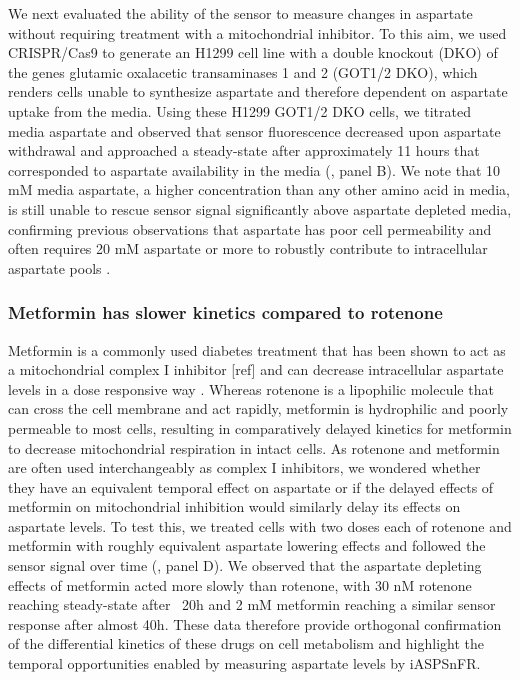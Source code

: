 \documentclass[9pt,lineno]{elife}
\begin{document}
We next evaluated the ability of the sensor to measure changes in aspartate without requiring treatment with a mitochondrial inhibitor.
To this aim, we used CRISPR/Cas9 to generate an H1299 cell line with a double knockout (DKO) of the genes glutamic oxalacetic transaminases 1 and 2 (GOT1/2 DKO), which renders cells unable to synthesize aspartate and therefore dependent on aspartate uptake from the media.
Using these H1299 GOT1/2 DKO cells, we titrated media aspartate and observed that sensor fluorescence decreased upon aspartate withdrawal and approached a steady-state after approximately 11 hours that corresponded to aspartate availability in the media (, panel B).
We note that 10 mM media aspartate, a higher concentration than any other amino acid in media, is still unable to rescue sensor signal significantly above aspartate depleted media, confirming previous observations that aspartate has poor cell permeability and often requires 20 mM aspartate or more to robustly contribute to intracellular aspartate pools \citep{Sullivan2018-gz}.


\subsubsection{Metformin has slower kinetics compared to rotenone}
Metformin is a commonly used diabetes treatment that has been shown to act as a mitochondrial complex I inhibitor [ref] and can decrease intracellular aspartate levels in a dose responsive way \citep{Gui2016-ca}.
Whereas rotenone is a lipophilic molecule that can cross the cell membrane and act rapidly, metformin is hydrophilic and poorly permeable to most cells, resulting in comparatively delayed kinetics for metformin to decrease mitochondrial respiration in intact cells.
As rotenone and metformin are often used interchangeably as complex I inhibitors, we wondered whether they have an equivalent temporal effect on aspartate or if the delayed effects of metformin on mitochondrial inhibition would similarly delay its effects on aspartate levels.
To test this, we treated cells with two doses each of rotenone and metformin with roughly equivalent aspartate lowering effects and followed the sensor signal over time (, panel D).
We observed that the aspartate depleting effects of metformin acted more slowly than rotenone, with 30 nM rotenone reaching steady-state after ~20h and 2 mM metformin reaching a similar sensor response after almost 40h.
These data therefore provide orthogonal confirmation of the differential kinetics of these drugs on cell metabolism and highlight the temporal opportunities enabled by measuring aspartate levels by iASPSnFR.
\end{document}

